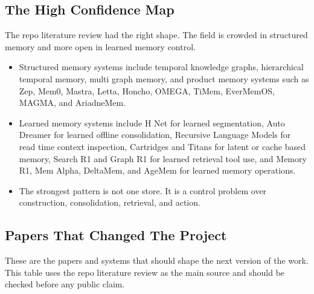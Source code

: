 \documentclass[11pt]{article}
\begin{document}
\subsection{The High Confidence Map}

The repo literature review had the right shape. The field is crowded in structured memory and more open in learned memory control.

\begin{itemize}
  \item Structured memory systems include temporal knowledge graphs, hierarchical temporal memory, multi graph memory, and product memory systems such as Zep, Mem0, Mastra, Letta, Honcho, OMEGA, TiMem, EverMemOS, MAGMA, and AriadneMem.
  \item Learned memory systems include H Net for learned segmentation, Auto Dreamer for learned offline consolidation, Recursive Language Models for read time context inspection, Cartridges and Titans for latent or cache based memory, Search R1 and Graph R1 for learned retrieval tool use, and Memory R1, Mem Alpha, DeltaMem, and AgeMem for learned memory operations.
  \item The strongest pattern is not one store. It is a control problem over construction, consolidation, retrieval, and action.
\end{itemize}

\subsection{Papers That Changed The Project}

These are the papers and systems that should shape the next version of the work. This table uses the repo literature review as the main source and should be checked before any public claim.
\end{document}
